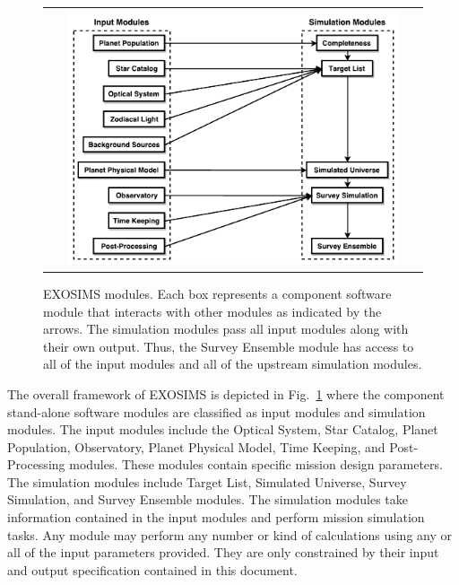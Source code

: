 \documentclass[cleanfoot]{asme2ej}
\begin{document}
\begin{figure}[ht]
    \begin{center}
        \begin{tabular}{c}
             \includegraphics[width=0.9\textwidth]{codeflow5}
        \end{tabular}
    \end{center}
    \caption{EXOSIMS modules. Each box represents a component software module that interacts with other modules as indicated by the arrows. The simulation modules pass all input modules along with their own output.  Thus, the Survey Ensemble module has access to all of the input modules and all of the upstream simulation modules.}
    \label{figure_framework}
\end{figure}

The overall framework of EXOSIMS is depicted in Fig.~\ref{figure_framework} where the component stand-alone software modules are classified as input modules and simulation modules.  The input modules include the Optical System, Star Catalog, Planet Population, Observatory, Planet Physical Model, Time Keeping, and Post-Processing modules.  These modules contain specific mission design parameters.  The simulation modules include Target List, Simulated Universe, Survey Simulation, and Survey Ensemble modules.  The simulation modules take information contained in the input modules and perform mission simulation tasks.  Any module may perform any number or kind of calculations using any or all of the input parameters provided.  They are only constrained by their input and output specification contained in this document.
\end{document}
